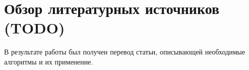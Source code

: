 \newpage

\section{Обзор литературных источников (TODO)}

В результате работы был получен перевод статьи, описывающей необходимые алгоритмы и их применение.


\clearpage